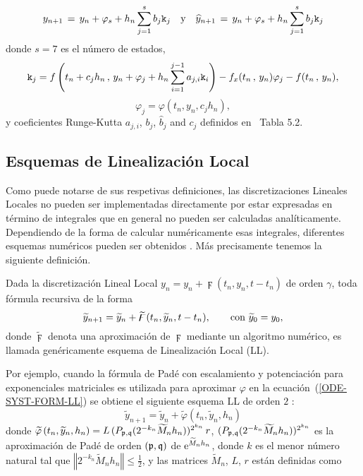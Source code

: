 \begin{equation}
y_{n+1}\,=\,y_n+\varphi_s+h_n \sum_{j=1}^{s}b_j \mathtt{k}_j \quad \text{y} \quad
\widehat{y}_{n+1}\,=\, y_n+\varphi_s+h_n \sum_{j=1}^{s}b_j \mathtt{k}_j
\label{LLDP scheme}
\end{equation}
donde $s = 7$ es el número de estados,
\[ \mathtt{k}_j = f\left( t_n+c_jh_n\, , \, y_n+\varphi_j+h_n \sum_{i=1}^{j-1}a_{j,i}\mathtt{k}_i \right)  
- f_x(t_n\, , \, y_n)\varphi_j - f(t_n\, ,\, y_n),\]
\[ \varphi _j = \varphi \left( t_{n},y_{n},c_jh_{n}\right), \]
y coeficientes Runge-Kutta $a_{j,i}$, $b_j$, $\hat{b}_j$ and $c_j$ definidos en~\cite{hairer1993solving} Tabla 5.2.

\subsection{Esquemas de Linealización Local}

Como puede notarse de sus respetivas definiciones, las
discretizaciones Lineales Locales no pueden ser implementadas directamente por
estar expresadas en término de integrales que en general no pueden ser
calculadas analíticamente. Dependiendo de la forma de calcular  numéricamente esas integrales,
 diferentes esquemas numéricos pueden ser obtenidos \cite{Jimenez05AMC,Jimenez13}.
 Más precisamente tenemos la siguiente definición.
\begin{definition}
	\label{definition LLS} Dada la discretización Lineal Local 
	  $y_n=y_{n}+\digamma(t_{n},y_{n},t-t_{n})$
	 de orden $\gamma $, toda fórmula recursiva de la forma 
	\begin{equation*}
	 \widetilde{y}_{n+1}=\widetilde{y}_{n}+\widetilde{\digamma}(t_{n},\widetilde{y}_{n},t-t_{n})
	 , \text{ \ \ \ \
		\ con }\widetilde{y}_{0}=y_{0},
	\end{equation*}%
	donde $\widetilde{\digamma}$ denota una aproximación
	de $\digamma$ mediante un algoritmo numérico, es
	llamada genéricamente esquema de Linealización Local (LL).
\end{definition}

Por ejemplo, cuando la fórmula de Padé con escalamiento y potenciación para exponenciales matriciales \cite{moler2003nineteen} es utilizada para
aproximar $\varphi$ en la ecuación~(\ref{ODE-SYST-FORM-LL}) se obtiene el siguiente esquema LL de orden $2$ \cite{Jimenez02AMC}:
\begin{equation} 
\widetilde{y}_{n+1}=\widetilde{y}_{n}+\widetilde{\varphi}\left( t_{n},\widetilde{y}_{n},h_{n}\right) \label{LL-scheme}
\end{equation} 
donde $\widetilde{\varphi }\left( t_{n},\widetilde{y}
_{n},h_{n}\right) =L\,(P_{\mathfrak{p},\mathfrak{q}}(2^{-k_{n}}\widetilde{M}_{n}h_{n}))^{2^{k_{n}}}\,r$, 
$(P_{\mathfrak{p},\mathfrak{q}}(2^{-k_{n}}\widetilde{M}_{n}h_{n}))^{2^{k_{n}}}$ es la aproximación
de Padé de orden $(\mathfrak{p},\mathfrak{q})$ de  $\mathrm{e}^{\widetilde{M}_{n}h_{n}}$, donde
$k$ es el menor número natural tal que $\left\Vert 2^{-k_{n}}\widetilde{M}_{n}h_{n}\right\Vert \leq \frac{1}{2}$, 
y las matrices $\widetilde{M}_{n}$, $L$, $r$ están definidas como

